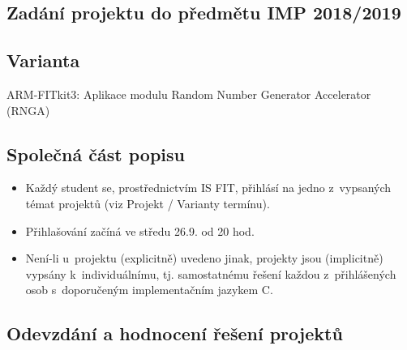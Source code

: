 \documentclass[11pt, a4paper, titlepage]{article}
\begin{document}
\begin{center}
    \section*{Zadání projektu do předmětu IMP 2018/2019}
    \medskip
\end{center}


\subsection*{Varianta}
ARM-FITkit3: Aplikace modulu Random Number Generator Accelerator (RNGA)


\subsection*{Společná část popisu}

\begin{itemize}
    \item Každý student se, prostřednictvím IS FIT, přihlásí na jedno z~vypsaných  témat projektů (viz Projekt / Varianty termínu).
    \item Přihlašování začíná ve středu 26.9. od 20 hod.
    \item Není-li u~projektu (explicitně) uvedeno jinak, projekty jsou (implicitně) vypsány k~individuálnímu, tj. samostatnému řešení každou z~přihlášených osob s~doporučeným implementačním jazykem C.
\end{itemize}


\subsection*{Odevzdání a hodnocení řešení projektů}
\end{document}
